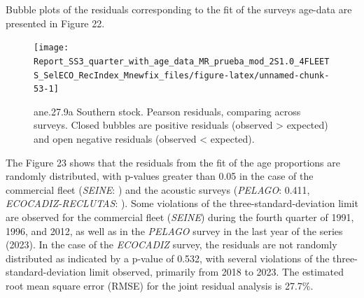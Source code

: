 \documentclass[
]{article}
\begin{document}
Bubble plots of the residuals corresponding to the fit of the surveys
age-data are presented in Figure 22.

\begin{figure}[H]

{\centering \texttt{[image: Report\_SS3\_quarter\_with\_age\_data\_MR\_prueba\_mod\_2S1.0\_4FLEETS\_SelECO\_RecIndex\_Mnewfix\_files/figure-latex/unnamed-chunk-53-1]} 

}

\caption{ane.27.9a Southern stock.  Pearson residuals, comparing across surveys. Closed bubbles are positive residuals (observed > expected) and open negative residuals (observed < expected).}\label{fig:unnamed-chunk-53}
\end{figure}

The Figure 23 shows that the residuals from the fit of the age
proportions are randomly distributed, with p-values greater than 0.05 in
the case of the commercial fleet (\emph{SEINE}: ) and the acoustic
surveys (\emph{PELAGO}: 0.411, \emph{ECOCADIZ-RECLUTAS}: ). Some
violations of the three-standard-deviation limit are observed for the
commercial fleet (\emph{SEINE}) during the fourth quarter of 1991, 1996,
and 2012, as well as in the \emph{PELAGO} survey in the last year of the
series (2023). In the case of the \emph{ECOCADIZ} survey, the residuals
are not randomly distributed as indicated by a p-value of 0.532, with
several violations of the three-standard-deviation limit observed,
primarily from 2018 to 2023. The estimated root mean square error (RMSE)
for the joint residual analysis is 27.7\%.
\end{document}
